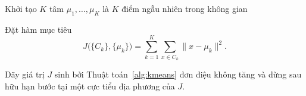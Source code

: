 \begin{algorithm}[H]
\caption{Thuật toán $K$-means}
\label{alg:kmeans}
Khởi tạo $K$ tâm $\mu_1, \ldots, \mu_K$ là $K$ điểm ngẫu nhiên trong không gian\;
\end{algorithm}

Đặt hàm mục tiêu
\[
    J\bigl(\{C_k\}, \{\mu_k\}\bigr) = \sum_{k=1}^K \sum_{x \in C_k} \|x - \mu_k\|^2.
\]

\iffalse
\begin{theorem}
\label{thm:kmeans-convergence}
Dãy giá trị $J$ sinh bởi Thuật toán~\ref{alg:kmeans} đơn điệu không tăng và dừng sau hữu hạn bước tại một cực tiểu địa phương của $J$.
\end{theorem}

